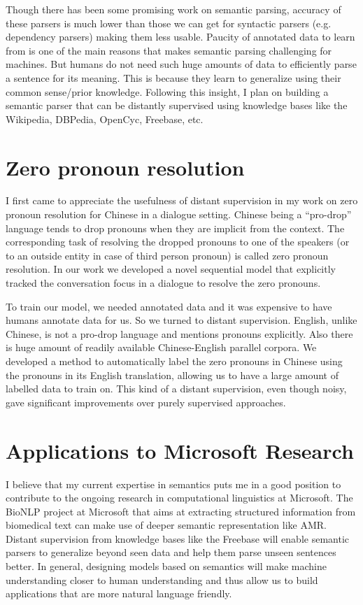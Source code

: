 \documentclass[11pt,a4paper]{article}
\begin{document}
Though there has been some promising work on semantic parsing, accuracy of these parsers is much lower than those we can get for syntactic parsers (e.g. dependency parsers) making them less usable. Paucity of annotated data to learn from is one of the main reasons that makes semantic parsing challenging for machines. But humans do not need such huge amounts of data to efficiently parse a sentence for its meaning. This is because they learn to generalize using their common sense/prior knowledge. Following this insight, I plan on building a semantic parser that can be distantly supervised using knowledge bases like the Wikipedia, DBPedia, OpenCyc, Freebase, etc.

\section{Zero pronoun resolution}
I first came to appreciate the usefulness of distant supervision in my work on zero pronoun resolution for Chinese \cite{rao-EtAl:2015:NAACL-HLT} in a dialogue setting. Chinese being a ``pro-drop'' language tends to drop pronouns when they are implicit from the context. The corresponding task of resolving the dropped pronouns to one of the speakers (or to an outside entity in case of third person pronoun) is called zero pronoun resolution. In our work we developed a novel sequential model that explicitly tracked the conversation focus in a dialogue to resolve the zero pronouns. 

To train our model, we needed annotated data and it was expensive to have humans annotate data for us. So we turned to distant supervision. English, unlike Chinese, is not a pro-drop language and mentions pronouns explicitly. Also there is huge amount of readily available Chinese-English parallel corpora. We developed a method to automatically label the zero pronouns in Chinese using the pronouns in its English translation, allowing us to have a large amount of labelled data to train on. This kind of a distant supervision, even though noisy, gave significant improvements over purely supervised approaches.

\section{Applications to Microsoft Research}
I believe that my current expertise in semantics puts me in a good position to contribute to the ongoing research in computational linguistics at Microsoft. The BioNLP project at Microsoft that aims at extracting structured information from biomedical text can make use of deeper semantic representation like AMR. Distant supervision from knowledge bases like the Freebase will enable semantic parsers to generalize beyond seen data and help them parse unseen sentences better. In general, designing models based on semantics will make machine understanding closer to human understanding and thus allow us to build applications that are more natural language friendly. 



\end{document}
